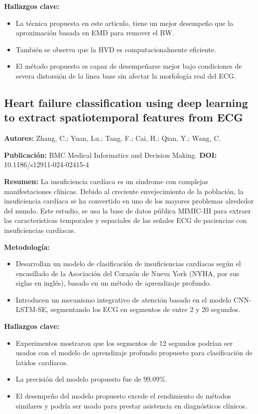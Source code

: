 \documentclass[spanish,11pt,letterpaper,oneside]{memoir}
\begin{document}
\textbf{Hallazgos clave:}
\begin{itemize}
	\item La técnica propuesta en este articulo, tiene un mejor desempeño que la aproximación basada en EMD para remover el BW.
	\item También se observa que la HVD es computacionalmente eficiente. 
	\item El método propuesto es capaz de desempeñarse mejor bajo condiciones de severa distorsión de la linea base sin afectar la morfología real del ECG.
\end{itemize}

\subsection{Heart failure classification using deep learning to extract spatiotemporal features from ECG \cite{Zhang24}}
\textbf{Autores:} Zhang, C.; Yuan, Lu.; Tang, F.; Cai, H.; Qian, Y.; Wang, C.

\textbf{Publicación:} BMC Medical Informatics and Decision Making.
\textbf{DOI:} 10.1186/s12911-024-02415-4

\textbf{Resumen:} La insuficiencia cardíaca es un síndrome con complejas manifestaciones clínicas. Debido al creciente envejecimiento de la población, la insuficiencia cardíaca se ha convertido en uno de los mayores problemas alrededor del mundo. Este estudio, se usa la base de datos pública MIMIC-III para extraer las caracteristicas temporales y espaciales de las señales ECG de paciencias con insuficiencias cardíacas.

\textbf{Metodología:}
\begin{itemize}
	\item Desarrollan un modelo de clasificación de insuficiencias cardíacas según el encasillado de la Asociación del Corazón de Nueva York (NYHA, por sus siglas en inglés), basado en un método de aprendizaje profundo.
	\item Introducen un mecanismo integrativo de atención basado en el modelo CNN-LSTM-SE, segmentando los ECG en segmentos de entre 2 y 20 segundos.
\end{itemize}

\textbf{Hallazgos clave:}
\begin{itemize}
	\item Experimentos mostraron que los segmentos de 12 segundos podrían ser usados con el modelo de aprendizaje profundo propuesto para clasificación de latidos cardíacos.
	\item La precisión del modelo propuesto fue de $99.09\%$.
	\item El desempeño del modelo propuesto excede el rendimiento de métodos similares y podría ser usado para prestar asistencia en diagnósticos clínicos.
\end{itemize}
\end{document}
